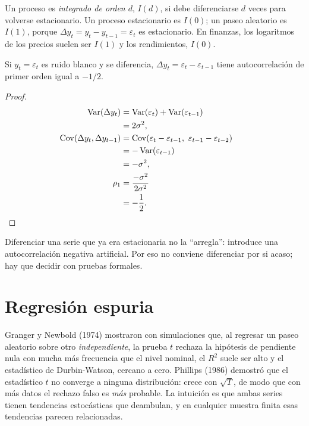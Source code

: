 \begin{definicion}
Un proceso es \emph{integrado de orden $d$}, $I(d)$, si debe diferenciarse $d$ veces para volverse
estacionario. Un proceso estacionario es $I(0)$; un paseo aleatorio es $I(1)$, porque
$\Delta y_t=y_t-y_{t-1}=\varepsilon_t$ es estacionario. En finanzas, los logaritmos de los precios suelen ser
$I(1)$ y los rendimientos, $I(0)$.
\end{definicion}

\begin{proposicion}[Sobrediferenciación]\label{prop:sobrediferencia}
Si $y_t=\varepsilon_t$ es ruido blanco y se diferencia, $\Delta y_t=\varepsilon_t-\varepsilon_{t-1}$ tiene
autocorrelación de primer orden igual a $-1/2$.
\end{proposicion}

\begin{proof}
\begin{align*}
  \Var(\Delta y_t)                    &= \Var(\varepsilon_t)+\Var(\varepsilon_{t-1})\\
                                      &= 2\sigma^2,\\
  \Cov(\Delta y_t,\Delta y_{t-1})     &= \Cov(\varepsilon_t-\varepsilon_{t-1},\ \varepsilon_{t-1}-\varepsilon_{t-2})\\
                                      &= -\Var(\varepsilon_{t-1})\\
                                      &= -\sigma^2,\\
  \rho_1                              &= \frac{-\sigma^2}{2\sigma^2}\\
                                      &= -\frac12 . && \qedhere
\end{align*}
\end{proof}

Diferenciar una serie que ya era estacionaria no la ``arregla'': introduce una autocorrelación negativa
artificial. Por eso no conviene diferenciar por si acaso; hay que decidir con pruebas formales.

\section{Regresión espuria}

Granger y Newbold (1974) mostraron con simulaciones que, al regresar un paseo aleatorio sobre otro
\emph{independiente}, la prueba $t$ rechaza la hipótesis de pendiente nula con mucha más frecuencia que el
nivel nominal, el $R^2$ suele ser alto y el estadístico de Durbin-Watson, cercano a cero. Phillips (1986)
demostró que el estadístico $t$ no converge a ninguna distribución: crece con $\sqrt T$, de modo que con más
datos el rechazo falso es \emph{más} probable. La intuición es que ambas series tienen tendencias
estocásticas que deambulan, y en cualquier muestra finita esas tendencias parecen relacionadas.

